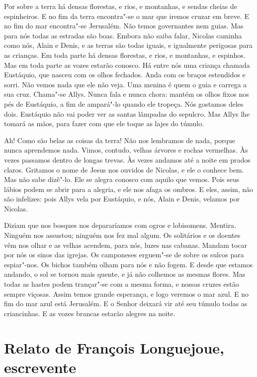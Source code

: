 Por sobre a terra há densas florestas, e rios, e montanhas, e sendas cheias
de espinheiros. E no fim da terra encontra"-se o mar que iremos cruzar em
breve. E no fim do mar encontra"-se Jerusalém. Não temos governantes nem
guias. Mas para nós todas as estradas são boas. Embora não saiba falar,
Nicolas caminha como nós, Alain e Denis, e as terras são todas iguais, e
igualmente perigosas para as crianças. Em toda parte há densas florestas,
e rios, e montanhas, e espinhos. Mas em toda parte as vozes estarão
conosco. Há entre nós uma criança chamada Eustáquio, que nasceu com os
olhos fechados. Anda com os braços estendidos e sorri. Não vemos nada que
ele não veja. Uma menina é quem o guia e carrega a sua cruz. Chama"-se
Allys. Nunca fala e nunca chora: mantém os olhos fixos nos pés de
Eustáquio, a fim de ampará"-lo quando ele tropeça. Nós gostamos deles dois.
Eustáquio não vai poder ver as santas lâmpadas do sepulcro. Mas Allys lhe
tomará as mãos, para fazer com que ele toque as lajes do túmulo.

Ah! Como são belas as coisas da terra! Não nos lembramos de nada, porque
nunca aprendemos nada. Vimos, contudo, velhas árvores e rochas vermelhas.
Às vezes passamos dentro de longas trevas. Às vezes andamos até a noite em
prados claros. Gritamos o nome de Jesus nos ouvidos de Nicolas, e ele o
conhece bem. Mas não sabe dizê"-lo. Ele se alegra conosco com aquilo que
vemos. Pois seus lábios podem se abrir para a alegria, e ele nos afaga os
ombros. E eles, assim, não são infelizes: pois Allys vela por Eustáquio, e
nós, Alain e Denis, velamos por Nicolas.

Diziam que nos bosques nos depararíamos com ogros e lobisomens. Mentira.
Ninguém nos assustou; ninguém nos fez mal algum. Os solitários e os
doentes vêm nos olhar e as velhas acendem, para nós, luzes nas cabanas.
Mandam tocar por nós os sinos das igrejas. Os camponeses erguem"-se de
sobre os sulcos para espiar"-nos. Os bichos também olham para nós e não
fogem. E desde que estamos andando, o sol se tornou mais quente, e já não
colhemos as mesmas flores. Mas todas as hastes podem trançar"-se com a
mesma forma, e nossas cruzes estão sempre viçosas. Assim temos grande
esperança, e logo veremos o mar azul. E no fim do mar azul está Jerusalém.
E o Senhor deixará vir até seu túmulo todas as criancinhas. E as vozes
brancas estarão alegres na noite.

\chapter{Relato de François Longuejoue, escrevente}

